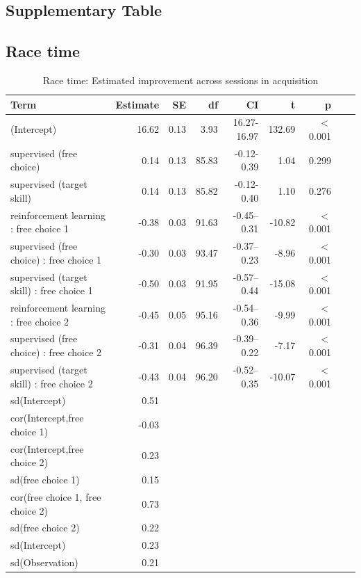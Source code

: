 \documentclass[pdflatex,sn-nature]{sn-jnl}%
\theoremstyle{thmstyleone}%
\theoremstyle{thmstyletwo}%
\theoremstyle{thmstylethree}%
\begin{document}
\begin{appendices}
\section{Supplementary Table}

\subsection{Race time}

\begin{table}[p]
\caption{Race time: Estimated improvement across sessions in acquisition}\label{table_racetime_acquisition_change}
\centering
\begin{tabular}{lrrrrrrrr}
  \hline
 Term & Estimate & SE & df & CI & t & p \\ 
  \hline
 (Intercept) & 16.62 & 0.13 & 3.93 & 16.27-16.97 & 132.69 &  $<$  0.001 \\ 
   supervised (free choice) & 0.14 & 0.13 & 85.83 & -0.12-0.39 & 1.04 &    0.299 \\ 
   supervised (target skill) & 0.14 & 0.13 & 85.82 & -0.12-0.40 & 1.10 &    0.276 \\ 
  reinforcement learning : free choice 1 & -0.38 & 0.03 & 91.63 & -0.45--0.31 & -10.82 &  $<$  0.001 \\ 
   supervised (free choice) : free choice 1 & -0.30 & 0.03 & 93.47 & -0.37--0.23 & -8.96 &  $<$  0.001 \\ 
   supervised (target skill) : free choice 1 & -0.50 & 0.03 & 91.95 & -0.57--0.44 & -15.08 &  $<$  0.001 \\ 
   reinforcement learning : free choice 2 & -0.45 & 0.05 & 95.16 & -0.54--0.36 & -9.99 &  $<$  0.001 \\ 
   supervised (free choice) : free choice 2 & -0.31 & 0.04 & 96.39 & -0.39--0.22 & -7.17 &  $<$  0.001 \\ 
   supervised (target skill) : free choice 2 & -0.43 & 0.04 & 96.20 & -0.52--0.35 & -10.07 &  $<$  0.001 \\ 
   sd(Intercept) & 0.51 &  &  &  &  &  &  \\ 
   cor(Intercept,free choice 1) & -0.03 &  &  &  &  &  &  \\ 
   cor(Intercept,free choice 2) & 0.23 &  &  &  &  &  &  \\ 
   sd(free choice 1) & 0.15 &  &  &  &  &  &  \\ 
   cor(free choice 1, free choice 2) & 0.73 &  &  &  &  &  &  \\ 
  sd(free choice 2) & 0.22 &  &  &  &  &  &  \\ 
   sd(Intercept) & 0.23 &  &  &  &  &  &  \\ 
   sd(Observation) & 0.21 &  &  &  &  &  &  \\ 
   \hline
\end{tabular}
\end{table}



\end{appendices}
\end{document}
